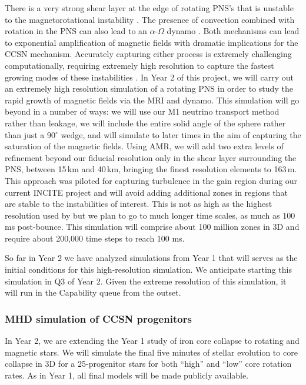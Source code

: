 \documentclass[12pt]{article}
\begin{document}
There is a very strong shear layer at the edge of rotating PNS's that is unstable to the magnetorotational instability \citep[MRI,][]{akiyama:2003, burrows:2007}.
The presence of convection combined with rotation in the PNS can also lead to an $\alpha$-$\Omega$ dynamo \citep{mosta:2015}.
Both mechanisms can lead to exponential amplification of magnetic fields with dramatic implications for the CCSN mechanism.
Accurately capturing either process is extremely challenging computationally, requiring extremely high resolution to capture the fastest growing modes of these instabilities \citep{mosta:2015}.
In Year 2 of this project, we will carry out an extremely high resolution simulation of a rotating PNS in order to study the rapid growth of magnetic fields via the MRI and dynamo.
This simulation will go beyond \citet{mosta:2015} in a number of ways: we will use our M1 neutrino transport method rather than leakage, we will include the entire solid angle of the sphere rather than just a 90$^\circ$ wedge, and will simulate to later times in the aim of capturing the saturation of the magnetic fields.
Using AMR, we will add two extra levels of refinement beyond our fiducial resolution only in the shear layer surrounding the PNS, between 15\,km and 40\,km, bringing the finest resolution elements to 163\,m.
This approach was piloted for capturing turbulence in the gain region during our current INCITE project and will avoid adding additional zones in regions that are stable to the instabilities of interest.
This is not as high as the highest resolution used by \citet{mosta:2015} but we plan to go to much longer time scales, as much as 100 ms post-bounce.
This simulation will comprise about 100 million zones in 3D and require about 200,000 time steps to reach 100 ms.

So far in Year 2 we have analyzed simulations from Year 1 that will serves as the initial conditions for this high-resolution simulation. We anticipate starting this simulation in Q3 of Year 2. Given the extreme resolution of this simulation, it will run in the Capability queue from the outset.

\subsubsection{MHD simulation of CCSN progenitors} 

In Year 2, we are extending the Year 1 study of iron core collapse to rotating and magnetic stars.
We will simulate the final five minutes of stellar evolution to core collapse in 3D for a 25-\msun progenitor stars for both ``high'' and ``low'' core rotation rates.
As in Year 1, all final models will be made publicly available.
\end{document}
